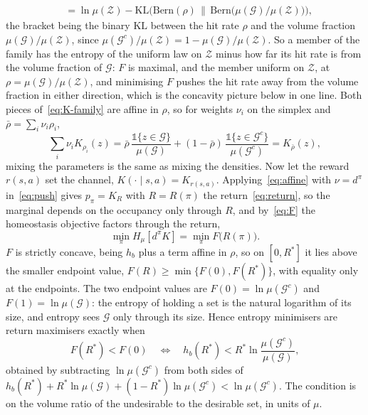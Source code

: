 \documentclass[11pt]{article}
\theoremstyle{remark}
\newcommand{\Zcal}{\mathcal Z}
\newcommand{\Gcal}{\mathcal G}
\newcommand{\1}{\mathds{1}}
\newcommand{\occ}{d^{\pi}}
\newcommand{\pz}{p_{\pi}}
\newcommand{\Hf}[1]{H_{\mu}\!\left[#1\right]}
\newcommand{\KL}{\mathrm{KL}}
\begin{document}
{\begin{align}
  &=\ln\mu(\Zcal)-\KL\Big(\mathrm{Bern}(\rho)\,\Big\|\,\mathrm{Bern}\big(\mu(\Gcal)/\mu(\Zcal)\big)\Big),
  \label{eq:F-kl}
\end{align}
the bracket being the binary $\KL$ between the hit rate $\rho$ and the volume fraction $\mu(\Gcal)/\mu(\Zcal)$, since $\mu(\Gcal^c)/\mu(\Zcal)=1-\mu(\Gcal)/\mu(\Zcal)$.
So a member of the family has the entropy of the uniform law on $\Zcal$ minus how far its hit rate is from the volume fraction of $\Gcal$: $F$ is maximal, and the member uniform on $\Zcal$, at $\rho=\mu(\Gcal)/\mu(\Zcal)$, and minimising $F$ pushes the hit rate away from the volume fraction in either direction, which is the concavity picture below in one line.
Both pieces of~\eqref{eq:K-family} are affine in $\rho$, so for weights $\nu_i$ on the simplex and $\bar\rho=\sum_i\nu_i\rho_i$,
\begin{equation}
  \sum_i \nu_i K_{\rho_i}(z)
  =\bar\rho\,\frac{\1\{z\in \Gcal\}}{\mu(\Gcal)}+(1-\bar\rho)\,\frac{\1\{z\in \Gcal^c\}}{\mu(\Gcal^c)}
  =K_{\bar\rho}(z),
  \label{eq:affine}
\end{equation}
mixing the parameters is the same as mixing the densities.
Now let the reward $r(s,a)$ set the channel, $K(\cdot\mid s,a)=K_{r(s,a)}$.
Applying~\eqref{eq:affine} with $\nu=\occ$ in~\eqref{eq:push} gives $\pz=K_{R}$ with $R=R(\pi)$ the return~\eqref{eq:return}, so the marginal depends on the occupancy only through $R$, and by~\eqref{eq:F} the homeostasis objective factors through the return,
\begin{equation}
  \min_{\pi}\Hf{\occ K}=\min_{\pi}F\big(R(\pi)\big).
  \label{eq:factor}
\end{equation}
$F$ is strictly concave, being $h_b$ plus a term affine in $\rho$, so on $[0,R^\ast]$ it lies above the smaller endpoint value, $F(R)\ge\min\{F(0),F(R^\ast)\}$, with equality only at the endpoints.
The two endpoint values are $F(0)=\ln\mu(\Gcal^c)$ and $F(1)=\ln\mu(\Gcal)$: the entropy of holding a set is the natural logarithm of its size, and entropy sees $\Gcal$ only through its size.
Hence entropy minimisers are return maximisers exactly when
\begin{equation}
  F(R^\ast)<F(0)
  \quad\Longleftrightarrow\quad
  h_b(R^\ast)<R^\ast\ln\frac{\mu(\Gcal^c)}{\mu(\Gcal)} ,
  \label{eq:condition}
\end{equation}
obtained by subtracting $\ln\mu(\Gcal^c)$ from both sides of $h_b(R^\ast)+R^\ast\ln\mu(\Gcal)+(1-R^\ast)\ln\mu(\Gcal^c)<\ln\mu(\Gcal^c)$.
The condition is on the volume ratio of the undesirable to the desirable set, in units of $\mu$.
}
\end{document}
